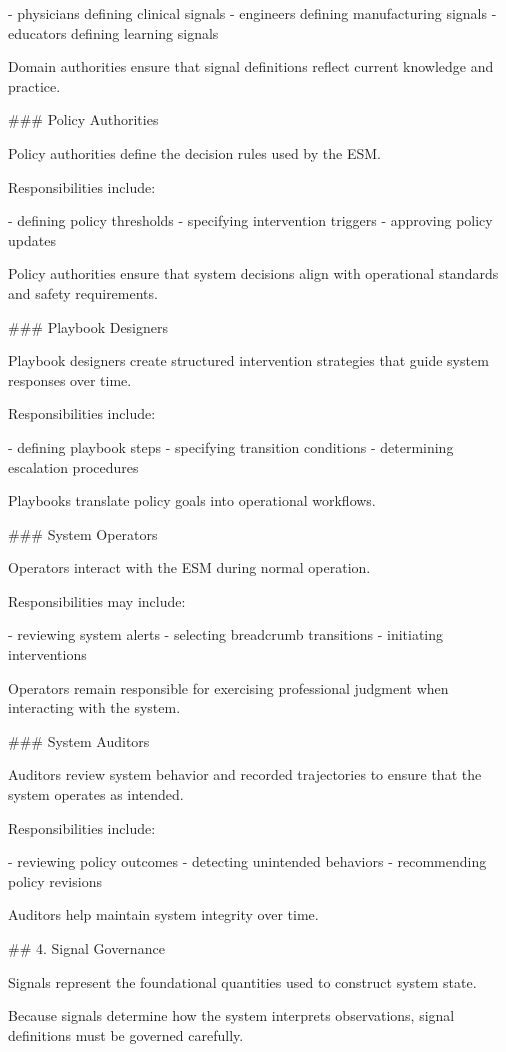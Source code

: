 - physicians defining clinical signals
- engineers defining manufacturing signals
- educators defining learning signals

Domain authorities ensure that signal definitions reflect current knowledge and practice.

### Policy Authorities

Policy authorities define the decision rules used by the ESM.

Responsibilities include:

- defining policy thresholds
- specifying intervention triggers
- approving policy updates

Policy authorities ensure that system decisions align with operational standards and safety requirements.

### Playbook Designers

Playbook designers create structured intervention strategies that guide system responses over time.

Responsibilities include:

- defining playbook steps
- specifying transition conditions
- determining escalation procedures

Playbooks translate policy goals into operational workflows.

### System Operators

Operators interact with the ESM during normal operation.

Responsibilities may include:

- reviewing system alerts
- selecting breadcrumb transitions
- initiating interventions

Operators remain responsible for exercising professional judgment when interacting with the system.

### System Auditors

Auditors review system behavior and recorded trajectories to ensure that the system operates as intended.

Responsibilities include:

- reviewing policy outcomes
- detecting unintended behaviors
- recommending policy revisions

Auditors help maintain system integrity over time.

## 4. Signal Governance

Signals represent the foundational quantities used to construct system state.

Because signals determine how the system interprets observations, signal definitions must be governed carefully.

